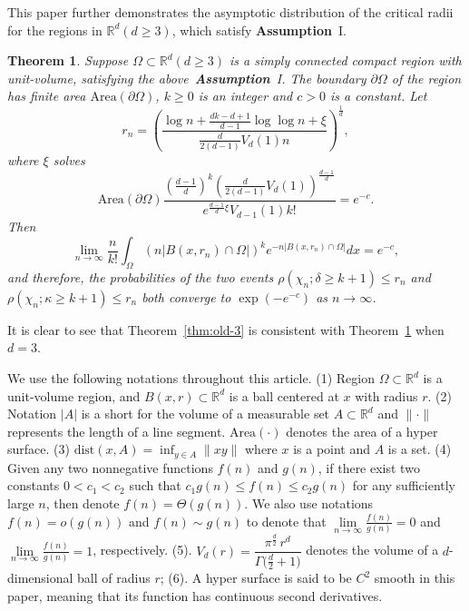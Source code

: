 \documentclass[preprint,12pt]{elsarticle}
\newtheorem{theorem}{Theorem}
\begin{document}
 This paper further demonstrates the asymptotic distribution of the critical radii for the  regions in $\mathbb{R}^d(d\geq3)$, which satisfy \textbf{Assumption}~I.


\begin{theorem} \label{thm:Main3D}
Suppose $\Omega\subset \mathbb{R}^d (d\geq 3) $  is a simply connected compact region with unit-volume,
satisfying the above~\textbf{Assumption}~I.
The boundary $\partial\Omega$ of the region has finite area $\mathrm{Area}(\partial\Omega)$, $k\geq 0$ is an integer and $c>0$ is a constant.
Let
 \begin{equation}\label{eq:Theorem-radius}
 r_n= \left( \frac{\log n+ \frac{dk-d+1}{d-1} \log\log n+\xi}{ \frac{d}{2(d-1)}V_d(1) n }\right)^{\frac1d},
\end{equation}
where $\xi$ solves
\begin{equation}\label{eq:Theorem-radius-1}
\mathrm{Area}(\partial\Omega)\frac{\left(\frac{d-1}{d}\right)^k\left(\frac{d}{2(d-1)}V_d(1)\right)^{\frac{d-1}{d}}}{e^{\frac{d-1}{d}\xi}{V_{d-1}(1)}k!}  =e^{-c}.
\end{equation}
Then
    \begin{equation}\label{eq:Theorem-formula-3}
       \lim_{n\rightarrow\infty} \frac n{k!}\int_{\Omega}\left(n|B(x,r_n)\cap\Omega|\right)^k e^{-n|B(x,r_n)\cap\Omega|}dx= e^{-c},
    \end{equation}
and therefore, the probabilities of the two events
$\rho(\chi_n;\delta\geq k+1)\leq r_n$ and $\rho(\chi_n;\kappa\geq
k+1)\leq r_n$ both converge to $\exp\left(-e^{-c}\right)$  as $n\rightarrow\infty$.
\end{theorem}

It is clear to see that Theorem~\ref{thm:old-3} is consistent with Theorem~\ref{thm:Main3D} when $d=3$.




\par
We use the following notations throughout this article.
(1) Region $\Omega \subset \mathbb{R}^d$ is a unit-volume    region, and $B(x,r)\subset \mathbb{R}^d$ is a ball
centered at $x$ with  radius $r$.
(2) Notation $|A|$ is a short  for the volume of a measurable set $A\subset \mathbb{R}^d$ and $\|\cdot\|$ represents the length of a line segment. $\mathrm{Area}(\cdot)$ denotes the area of a hyper surface.
(3) $\mathrm{dist}(x, A)=\inf_{y\in A}\|xy\|$ where $x$ is a point and $A$ is a set.
(4) Given any two nonnegative functions $f(n)$ and $g(n)$, if there exist two constants $0<c_1<c_2$ such that
$c_1g(n)\leq f(n)\leq c_2g(n)$ for any sufficiently large $n$, then  denote $f(n)=\Theta(g(n))$.
We also use notations $f(n)=o(g(n))$ and $f(n)\sim g(n)$ to denote that $\lim\limits_{n\rightarrow\infty}\frac{f(n)}{g(n)}=0$ and $\lim\limits_{n\rightarrow\infty}\frac{f(n)}{g(n)}=1$, respectively.  (5). \(V_{d}(r)=\dfrac{\pi^{\tfrac{d}{2}}\,r^{d}}{\Gamma\bigl(\tfrac{d}{2}+1\bigr)}\) denotes the volume of a \(d\)-dimensional ball of radius \(r\); (6). A hyper surface is said to be $C^2$ smooth in this paper, meaning  that its function has continuous second derivatives.
\end{document}
